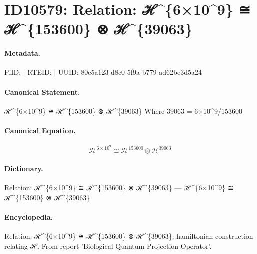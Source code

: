 \section*{ID10579: Relation: ℋ\textasciicircum{}\{6×10\textasciicircum{}9\} ≅ ℋ\textasciicircum{}\{153600\} ⊗ ℋ\textasciicircum{}\{39063\}}
\paragraph{Metadata.}
PiID:  | RTEID:  | UUID: 80e5a123-d8c0-5f9a-b779-ad62be3d5a24

\paragraph{Canonical Statement.}
ℋ\textasciicircum{}\{6×10\textasciicircum{}9\} ≅ ℋ\textasciicircum{}\{153600\} ⊗ ℋ\textasciicircum{}\{39063\} Where 39063 = 6×10\textasciicircum{}9/153600

\paragraph{Canonical Equation.}
\[
ℋ^{6×10^9} ≅ ℋ^{153600} ⊗ ℋ^{39063}
\]

\paragraph{Dictionary.}
Relation: ℋ\textasciicircum{}\{6×10\textasciicircum{}9\} ≅ ℋ\textasciicircum{}\{153600\} ⊗ ℋ\textasciicircum{}\{39063\} — ℋ\textasciicircum{}\{6×10\textasciicircum{}9\} ≅ ℋ\textasciicircum{}\{153600\} ⊗ ℋ\textasciicircum{}\{39063\}

\paragraph{Encyclopedia.}
Relation: ℋ\textasciicircum{}\{6×10\textasciicircum{}9\} ≅ ℋ\textasciicircum{}\{153600\} ⊗ ℋ\textasciicircum{}\{39063\}: hamiltonian construction relating ℋ. From report 'Biological Quantum Projection Operator'.
